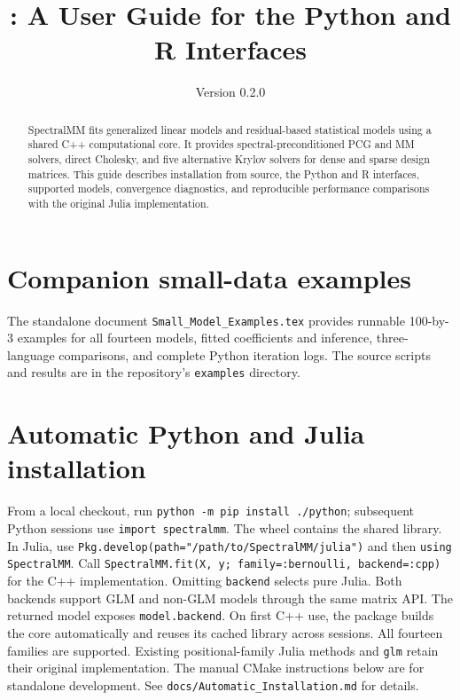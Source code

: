\documentclass[11pt,a4paper]{article}
\title{\pkg: A User Guide for the Python and R Interfaces}
\author{}
\date{Version 0.2.0}
\newcommand{\pkg}{\textsf{SpectralMM}}
\begin{document}

\maketitle
\begin{abstract}
\pkg{} fits generalized linear models and residual-based statistical models
using a shared C++ computational core. It provides spectral-preconditioned
PCG and MM solvers, direct Cholesky, and five alternative Krylov solvers for dense and sparse design
matrices. This guide describes installation from source, the Python and R
interfaces, supported models, convergence diagnostics, and reproducible
performance comparisons with the original Julia implementation.
\end{abstract}
\tableofcontents
\clearpage

\section*{Companion small-data examples}
The standalone document \texttt{Small\_Model\_Examples.tex} provides runnable
100-by-3 examples for all fourteen models, fitted coefficients and inference,
three-language comparisons, and complete Python iteration logs. The source
scripts and results are in the repository's \texttt{examples} directory.

\section*{Automatic Python and Julia installation}
From a local checkout, run \texttt{python -m pip install ./python}; subsequent Python
sessions use \texttt{import spectralmm}. The wheel contains the shared library.
In Julia, use \texttt{Pkg.develop(path="/path/to/SpectralMM/julia")} and then
\texttt{using SpectralMM}. Call \texttt{SpectralMM.fit(X, y; family=:bernoulli, backend=:cpp)}
for the C++ implementation. Omitting \texttt{backend} selects pure Julia.
Both backends support GLM and non-GLM models through the same matrix API.
The returned model exposes \texttt{model.backend}. On first C++ use, the package builds the core automatically and reuses
its cached library across sessions. All fourteen families are supported.
Existing positional-family Julia methods and \texttt{glm} retain their original
implementation. The manual CMake instructions below are for standalone development.
See \texttt{docs/Automatic\_Installation.md} for details.
\end{document}
